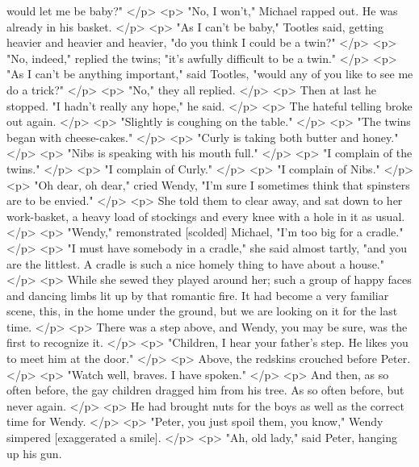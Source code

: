       would let me be baby?"
    </p>
    <p>
      "No, I won't," Michael rapped out. He was already in his basket.
    </p>
    <p>
      "As I can't be baby," Tootles said, getting heavier and heavier and
      heavier, "do you think I could be a twin?"
    </p>
    <p>
      "No, indeed," replied the twins; "it's awfully difficult to be a twin."
    </p>
    <p>
      "As I can't be anything important," said Tootles, "would any of you like
      to see me do a trick?"
    </p>
    <p>
      "No," they all replied.
    </p>
    <p>
      Then at last he stopped. "I hadn't really any hope," he said.
    </p>
    <p>
      The hateful telling broke out again.
    </p>
    <p>
      "Slightly is coughing on the table."
    </p>
    <p>
      "The twins began with cheese-cakes."
    </p>
    <p>
      "Curly is taking both butter and honey."
    </p>
    <p>
      "Nibs is speaking with his mouth full."
    </p>
    <p>
      "I complain of the twins."
    </p>
    <p>
      "I complain of Curly."
    </p>
    <p>
      "I complain of Nibs."
    </p>
    <p>
      "Oh dear, oh dear," cried Wendy, "I'm sure I sometimes think that
      spinsters are to be envied."
    </p>
    <p>
      She told them to clear away, and sat down to her work-basket, a heavy load
      of stockings and every knee with a hole in it as usual.
    </p>
    <p>
      "Wendy," remonstrated [scolded] Michael, "I'm too big for a cradle."
    </p>
    <p>
      "I must have somebody in a cradle," she said almost tartly, "and you are
      the littlest. A cradle is such a nice homely thing to have about a house."
    </p>
    <p>
      While she sewed they played around her; such a group of happy faces and
      dancing limbs lit up by that romantic fire. It had become a very familiar
      scene, this, in the home under the ground, but we are looking on it for
      the last time.
    </p>
    <p>
      There was a step above, and Wendy, you may be sure, was the first to
      recognize it.
    </p>
    <p>
      "Children, I hear your father's step. He likes you to meet him at the
      door."
    </p>
    <p>
      Above, the redskins crouched before Peter.
    </p>
    <p>
      "Watch well, braves. I have spoken."
    </p>
    <p>
      And then, as so often before, the gay children dragged him from his tree.
      As so often before, but never again.
    </p>
    <p>
      He had brought nuts for the boys as well as the correct time for Wendy.
    </p>
    <p>
      "Peter, you just spoil them, you know," Wendy simpered [exaggerated a
      smile].
    </p>
    <p>
      "Ah, old lady," said Peter, hanging up his gun.
